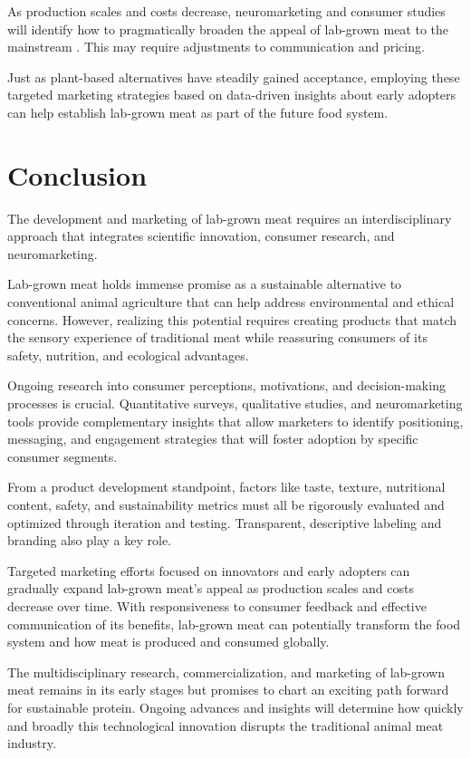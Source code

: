 \documentclass[10pt]{article}
\begin{document}
\begin{sloppypar}
  As production scales and costs decrease, neuromarketing and consumer studies will identify how to pragmatically broaden the appeal of lab-grown meat to the mainstream \citep{verbeke_would_2015}. This may require adjustments to communication and pricing.

  Just as plant-based alternatives have steadily gained acceptance, employing these targeted marketing strategies based on data-driven insights about early adopters can help establish lab-grown meat as part of the future food system.

  \section{Conclusion}
  \label{sec:conclusion}

  The development and marketing of lab-grown meat requires an interdisciplinary approach that integrates scientific innovation, consumer research, and neuromarketing.

  Lab-grown meat holds immense promise as a sustainable alternative to conventional animal agriculture that can help address environmental and ethical concerns. However, realizing this potential requires creating products that match the sensory experience of traditional meat while reassuring consumers of its safety, nutrition, and ecological advantages.

  Ongoing research into consumer perceptions, motivations, and decision-making processes is crucial. Quantitative surveys, qualitative studies, and neuromarketing tools provide complementary insights that allow marketers to identify positioning, messaging, and engagement strategies that will foster adoption by specific consumer segments.

  From a product development standpoint, factors like taste, texture, nutritional content, safety, and sustainability metrics must all be rigorously evaluated and optimized through iteration and testing. Transparent, descriptive labeling and branding also play a key role.

  Targeted marketing efforts focused on innovators and early adopters can gradually expand lab-grown meat's appeal as production scales and costs decrease over time. With responsiveness to consumer feedback and effective communication of its benefits, lab-grown meat can potentially transform the food system and how meat is produced and consumed globally.

  The multidisciplinary research, commercialization, and marketing of lab-grown meat remains in its early stages but promises to chart an exciting path forward for sustainable protein. Ongoing advances and insights will determine how quickly and broadly this technological innovation disrupts the traditional animal meat industry.

  \pagebreak
  \singlespacing %
  
  

\end{sloppypar}
\end{document}

